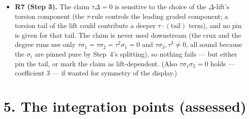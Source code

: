 \documentclass[11pt,a4paper]{article}
\begin{document}
\begin{itemize}[leftmargin=1.4em,itemsep=3pt]
\item \textbf{R7 (Step 3).} The claim $\tau\Delta=0$ is sensitive to the
choice of the $\Delta$-lift's torsion component (the $\tau$-rule controls
the leading graded component; a torsion tail of the lift could contribute a
deeper $\tau\cdot(\text{tail})$ term), and no pin is given for that tail. The
claim is never used downstream (the crux and the degree runs use only
$\tau\sigma_1=\tau\sigma_2=\tau^2\sigma_1=0$ and $\tau\sigma_3,\tau^3\ne0$,
all sound because the $\sigma_i$ are pinned pure by Step~4's splitting), so
nothing fails --- but either pin the tail, or mark the claim as
lift-dependent. (Also $\tau\sigma_1\sigma_2=0$ holds --- coefficient $3$ ---
if wanted for symmetry of the display.)
\end{itemize}

\section*{5. The integration points (assessed)}
\end{document}
